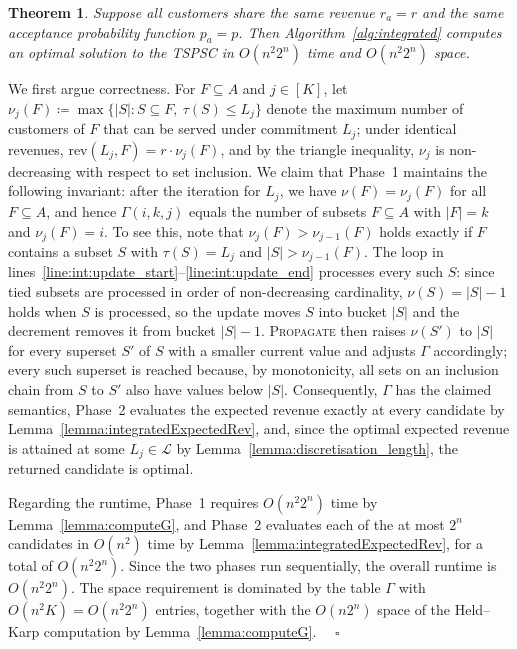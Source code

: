 \documentclass[11pt]{article}
\theoremstyle{plain}
\newtheorem{theorem}{Theorem}
\theoremstyle{definition}
\renewenvironment{proof}[1]{\par\noindent{\itshape #1}\space\ignorespaces}{\par\medskip}
\newcommand{\Halmos}{\ensuremath{\quad\square}}
\begin{document}
	\begin{theorem}\label{thm:opt2}
		Suppose all customers share the same revenue $r_a = r$ and the same acceptance probability function $p_a = p$. Then Algorithm~\ref{alg:integrated} computes an optimal solution to the \ac{TSPSC} in $O(n^2 2^n)$ time and $O(n^2 2^n)$ space.
	\end{theorem}
	\begin{proof}{Proof.}
		We first argue correctness. For $F \subseteq A$ and $j \in [K]$, let $\nu_j(F) \coloneqq \max\{|S| \colon S \subseteq F,\ \tau(S) \leq L_j\}$ denote the maximum number of customers of $F$ that can be served under commitment $L_j$; under identical revenues, $\text{rev}(L_j, F) = r \cdot \nu_j(F)$, and by the triangle inequality, $\nu_j$ is non-decreasing with respect to set inclusion. We claim that Phase~1 maintains the following invariant: after the iteration for $L_j$, we have $\nu(F) = \nu_j(F)$ for all $F \subseteq A$, and hence $\Gamma(i, k, j)$ equals the number of subsets $F \subseteq A$ with $|F| = k$ and $\nu_j(F) = i$. To see this, note that $\nu_j(F) > \nu_{j-1}(F)$ holds exactly if $F$ contains a subset $S$ with $\tau(S) = L_j$ and $|S| > \nu_{j-1}(F)$. The loop in lines~\ref{line:int:update_start}--\ref{line:int:update_end} processes every such $S$: since tied subsets are processed in order of non-decreasing cardinality, $\nu(S) = |S| - 1$ holds when $S$ is processed, so the update moves $S$ into bucket $|S|$ and the decrement removes it from bucket $|S| - 1$. \textsc{Propagate} then raises $\nu(S')$ to $|S|$ for every superset $S'$ of $S$ with a smaller current value and adjusts $\Gamma$ accordingly; every such superset is reached because, by monotonicity, all sets on an inclusion chain from $S$ to $S'$ also have values below $|S|$. Consequently, $\Gamma$ has the claimed semantics, Phase~2 evaluates the expected revenue exactly at every candidate by Lemma~\ref{lemma:integratedExpectedRev}, and, since the optimal expected revenue is attained at some $L_j \in \mathcal{L}$ by Lemma~\ref{lemma:discretisation_length}, the returned candidate is optimal.

		Regarding the runtime, Phase~1 requires $O(n^2 2^n)$ time by Lemma~\ref{lemma:computeG}, and Phase~2 evaluates each of the at most $2^n$ candidates in $O(n^2)$ time by Lemma~\ref{lemma:integratedExpectedRev}, for a total of $O(n^2 2^n)$. Since the two phases run sequentially, the overall runtime is $O(n^2 2^n)$. The space requirement is dominated by the table $\Gamma$ with $O(n^2 K) = O(n^2 2^n)$ entries, together with the $O(n 2^n)$ space of the Held--Karp computation by Lemma~\ref{lemma:computeG}.
	\Halmos
\end{proof}
    
\end{document}
